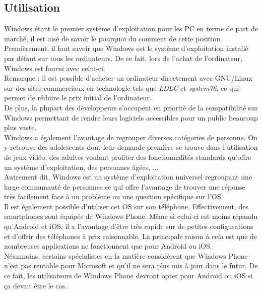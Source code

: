 \clearpage

\subsection{Utilisation}
Windows étant le premier système d'exploitation pour les PC en terme de part de
marché, il est aisé de savoir le pourquoi du comment de cette position. \\

Premièrement, il faut savoir que Windows est le système d'exploitation installé
par défaut sur tous les ordinateurs. De ce fait, lors de l'achat de
l'ordinateur, Windows est fourni avec celui-ci. \\

Remarque : il est possible d'acheter un ordinateur directement avec GNU/Linux
sur des sites commerciaux en technologie tels que \textit{LDLC} et
\textit{system76}, ce qui permet de réduire le prix initial de l'ordinateur. \\

De plus, la plupart des développeurs s'occupent en priorité de la compatibilité
sur Windows permettant de rendre leurs logiciels accessibles pour un public
beaucoup plus vaste. \\

Windows a également l'avantage de regrouper diverses catégories de personne. On
y retrouve des adolescents dont leur demande première se trouve dans
l'utilisation de jeux vidéo, des adultes voulant profiter des fonctionnalités
standards qu'offre un système d'exploitation, des personnes âgées, ... \\

Autrement dit, Windows est un système d'exploitation universel regroupant une
large communauté de personnes ce qui offre l'avantage de trouver une réponse
très facilement face à un problème ou une question spécifique sur l'OS. \\

Il est également possible d'utiliser cet OS sur son téléphone.
Effectivement, des smartphones sont équipés de Windows Phone. Même si celui-ci
est moins répandu qu'Android et iOS, il a l'avantage d'être très rapide sur de
petites configurations et d'offrir des téléphones à prix raisonnable. La
principale raison à cela est que de nombreuses applications ne fonctionnent que
pour Android ou iOS. \\

Néanmoins, certains spécialistes en la matière considèrent que Windows Phone
n'est pas rentable pour Microsoft et qu'il ne sera plus mis à jour dans le
futur. De ce fait, les utilisateurs de Windows Phone devront opter pour Android
ou iOS si ça devait être le cas.

